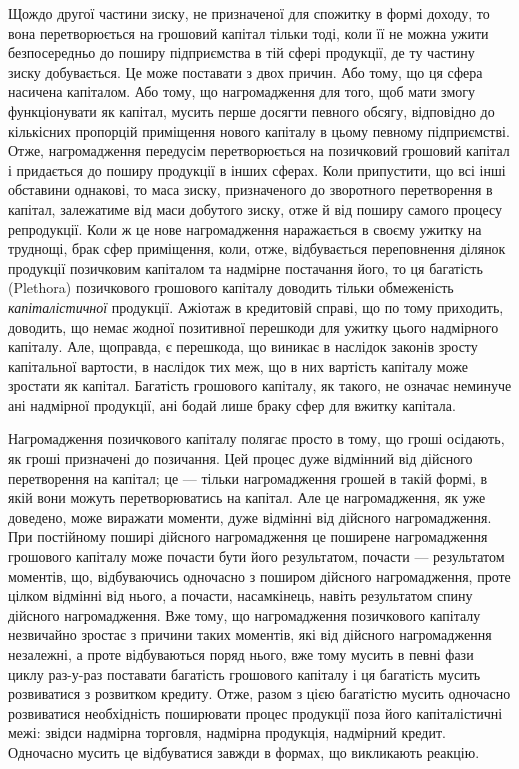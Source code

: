 Щождо другої частини зиску, не призначеної для спожитку в формі доходу,
то вона перетворюється на грошовий капітал тільки тоді, коли її не можна
ужити безпосередньо до поширу підприємства в тій сфері продукції, де ту частину
зиску добувається. Це може поставати з двох причин. Або тому, що ця сфера
насичена капіталом. Або тому, що нагромадження для того, щоб мати змогу
функціонувати як капітал, мусить перше досягти певного обсягу, відповідно
до кількісних пропорцій приміщення нового капіталу в цьому певному підприємстві.
Отже, нагромадження передусім перетворюється на позичковий грошовий капітал
і придається до поширу продукції в інших сферах. Коли припустити, що всі
інші обставини однакові, то маса зиску, призначеного до зворотного перетворення
в капітал, залежатиме від маси добутого зиску, отже й від поширу самого процесу
репродукції. Коли ж це нове нагромадження наражається в своєму ужитку
на труднощі, брак сфер приміщення, коли, отже, відбувається переповнення ділянок
продукції позичковим капіталом та надмірне постачання його, то ця багатість
(Plethora) позичкового грошового капіталу доводить тільки обмеженість \emph{капіталістичної}
продукції. Ажіотаж в кредитовій справі, що по тому приходить, доводить,
що немає жодної позитивної перешкоди для ужитку цього надмірного капіталу.
Але, щоправда, є перешкода, що виникає в наслідок законів зросту капітальної
вартости, в наслідок тих меж, що в них вартість капіталу може зростати
як капітал. Багатість грошового капіталу, як такого, не означає неминуче ані
надмірної продукції, ані бодай лише браку сфер для вжитку капітала.

Нагромадження позичкового капіталу полягає просто в тому, що гроші
осідають, як гроші призначені до позичання. Цей процес дуже відмінний від
дійсного перетворення на капітал; це — тільки нагромадження грошей в такій
формі, в якій вони можуть перетворюватись на капітал. Але це нагромадження,
як уже доведено, може виражати моменти, дуже відмінні від дійсного нагромадження.
При постійному поширі дійсного нагромадження це поширене нагромадження
грошового капіталу може почасти бути його результатом, почасти —
результатом моментів, що, відбуваючись одночасно з поширом дійсного нагромадження,
проте цілком відмінні від нього, а почасти, насамкінець, навіть результатом
спину дійсного нагромадження. Вже тому, що нагромадження позичкового
капіталу незвичайно зростає з причини таких моментів, які від дійсного
нагромадження незалежні, а проте відбуваються поряд нього, вже тому мусить
в певні фази циклу раз-у-раз поставати багатість грошового капіталу і ця
багатість мусить розвиватися з розвитком кредиту. Отже, разом з цією багатістю
мусить одночасно розвиватися необхідність поширювати процес продукції поза його
капіталістичні межі: звідси надмірна торговля, надмірна продукція, надмірний
кредит. Одночасно мусить це відбуватися завжди в формах, що викликають
реакцію.

